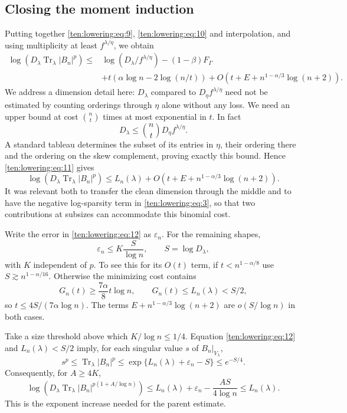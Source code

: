 \subsection{Closing the moment induction}
Putting together \eqref{ten:lowering:eq:9}, \eqref{ten:lowering:eq:10} and interpolation, and using multiplicity at least \(f^{\lambda/\eta}\), we obtain
\begin{equation}
\begin{split}
 \log( D_\lambda\operatorname{Tr}_\lambda |B_n|^p )
 \le {}&\log(D_\lambda/f^{\lambda/\eta})-(1-\beta) F_\Gamma\\
 &+t(\alpha\log n-2\log(n/t))
                   +O(t+E+n^{1-\alpha/3}\log(n+2)).
\end{split}                                                               \label{ten:lowering:eq:11}
\end{equation}
We address a dimension detail here: \(D_\lambda\) compared to \(D_\eta f^{\lambda/\eta}\) need not be estimated by counting orderings through \(\eta\) alone without any loss. We need an upper bound at cost \(\binom{n}{t}\) times at most exponential in \(t\). In fact
\[
                       D_\lambda\le \binom{n}{t} D_\eta f^{\lambda/\eta}.
\]
A standard tableau determines the subset of its entries in \(\eta\), their ordering there and the ordering on the skew complement, proving exactly this bound. Hence \eqref{ten:lowering:eq:11} gives
\begin{equation}
               \log( D_\lambda\operatorname{Tr}_\lambda |B_n|^p )
                  \le L_n(\lambda)+O(t+E+n^{1-\alpha/3}\log(n+2)).
                                                                         \label{ten:lowering:eq:12}
\end{equation}
It was relevant both to transfer the clean dimension through the middle and to have the negative log-sparsity term in \eqref{ten:lowering:eq:3}, so that two contributions at subsizes can accommodate this binomial cost.

Write the error in \eqref{ten:lowering:eq:12} as $\varepsilon_n$.
For the remaining shapes,
\[
 \varepsilon_n\le K\frac{S}{\log n},\qquad S=\log D_\lambda,
\]
with $K$ independent of $p$. To see this for its $O(t)$ term,
if $t<n^{1-\alpha/8}$ use $S\gtrsim n^{1-\alpha/16}$.
Otherwise the minimizing cost contains
\[
 G_n(t)\ge\frac{7\alpha}{8}t\log n,
 \qquad G_n(t)\le L_n(\lambda)<S/2,
\]
so $t\le4S/(7\alpha\log n)$. The terms
$E+n^{1-\alpha/3}\log(n+2)$ are $o(S/\log n)$ in both cases.

Take a size threshold above which $K/\log n\le1/4$. Equation
\eqref{ten:lowering:eq:12} and $L_n(\lambda)<S/2$ imply, for each
singular value $s$ of $B_n|_{V_\lambda}$,
\[
 s^p\le\operatorname{Tr}_\lambda|B_n|^p
 \le\exp\{L_n(\lambda)+\varepsilon_n-S\}
 \le e^{-S/4}.
\]
Consequently, for $A\ge4K$,
\[
 \log\!\left(D_\lambda\operatorname{Tr}_\lambda
       |B_n|^{p(1+A/\log n)}\right)
 \le L_n(\lambda)+\varepsilon_n-\frac{AS}{4\log n}
 \le L_n(\lambda).
\]
This is the exponent increase needed for the parent estimate.

